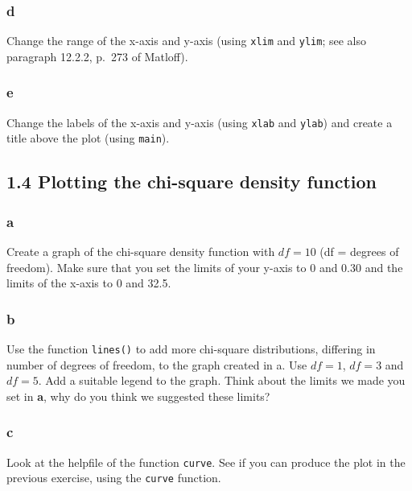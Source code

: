 \documentclass[]{article}
\begin{document}
\hypertarget{d-1}{%
\subsubsection{d}\label{d-1}}

Change the range of the x-axis and y-axis (using \texttt{xlim} and
\texttt{ylim}; see also paragraph 12.2.2, p.~273 of Matloff).

\hypertarget{e}{%
\subsubsection{e}\label{e}}

Change the labels of the x-axis and y-axis (using \texttt{xlab} and
\texttt{ylab}) and create a title above the plot (using \texttt{main}).

\hypertarget{plotting-the-chi-square-density-function}{%
\subsection{1.4 Plotting the chi-square density
function}\label{plotting-the-chi-square-density-function}}

\hypertarget{a-3}{%
\subsubsection{a}\label{a-3}}

Create a graph of the chi-square density function with \(df = 10\) (df =
degrees of freedom). Make sure that you set the limits of your y-axis to
0 and 0.30 and the limits of the x-axis to 0 and 32.5.

\hypertarget{b-3}{%
\subsubsection{b}\label{b-3}}

Use the function \texttt{lines()} to add more chi-square distributions,
differing in number of degrees of freedom, to the graph created in a.
Use \(df = 1\), \(df = 3\) and \(df = 5\). Add a suitable legend to the
graph. Think about the limits we made you set in \textbf{a}, why do you
think we suggested these limits?

\hypertarget{c-3}{%
\subsubsection{c}\label{c-3}}

Look at the helpfile of the function \texttt{curve}. See if you can
produce the plot in the previous exercise, using the \texttt{curve}
function.
\end{document}
